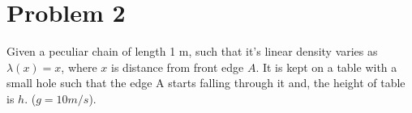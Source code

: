 \documentclass[11pt,a4paper,fleqn]{scrartcl}
\begin{document}
\section{Problem 2}
\begin{problem}

Given a peculiar chain of length 1 m, such that it's
linear density varies as $\lambda(x)=x$, where $x$ is distance from
front edge $A$. It is kept on a table with a small hole
such that the edge A starts falling through it and, the height
of table is $h$. ($g=10 m/s$).

 \begin{center}
     


\begin{tikzpicture}[x=0.75pt,y=0.75pt,yscale=-1,xscale=1]


\end{tikzpicture}
\end{center}
\end{problem}
\end{document}
